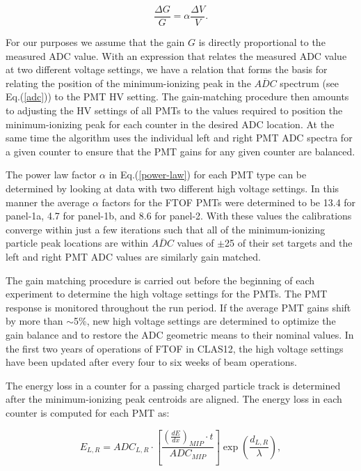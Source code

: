 \documentclass[final,3p,twocolumn]{elsarticle}
\begin{document}
\begin{equation}
\label{delta}
\frac{\Delta G}{G} = \alpha \frac{\Delta V}{V}.
\end{equation}

\noindent
For our purposes we assume that the gain $G$ is directly proportional to the measured ADC value. With an
expression that relates the measured ADC value at two different voltage settings, we have a relation that
forms the basis for relating the position of the minimum-ionizing peak in the $\overline{ADC}$ spectrum
(see Eq.(\ref{adc})) to the PMT HV setting. The gain-matching procedure then amounts to adjusting the HV
settings of all PMTs to the values required to position the minimum-ionizing peak for each counter in the
desired ADC location. At the same time the algorithm uses the individual left and right PMT ADC spectra for
a given counter to ensure that the PMT gains for any given counter are balanced.

The power law factor $\alpha$ in Eq.(\ref{power-law}) for each PMT type can be determined by looking
at data with two different high voltage settings. In this manner the average $\alpha$ factors for the
FTOF PMTs were determined to be 13.4 for panel-1a, 4.7 for panel-1b, and 8.6 for panel-2. With these
values the calibrations converge within just a few iterations such that all of the minimum-ionizing particle
peak locations are within $\overline{ADC}$ values of $\pm$25 of their set targets and the left and right
PMT ADC values are similarly gain matched.

The gain matching procedure is carried out before the beginning of each experiment to determine the
high voltage settings for the PMTs. The PMT response is monitored throughout the run period. If the
average PMT gains shift by more than $\sim$5\%, new high voltage settings are determined to optimize
the gain balance and to restore the ADC geometric means to their nominal values. In the first two years of
operations of FTOF in CLAS12, the high voltage settings have been updated after every four to six weeks
of beam operations.

The energy loss in a counter for a passing charged particle track is determined after the minimum-ionizing
peak centroids are aligned. The energy loss in each counter is computed for each PMT as:

\begin{equation}
E_{L,R} = ADC_{L,R} \cdot \left [ \frac{\left( \frac{dE}{dx} \right)_{MIP} \cdot t}{ADC_{MIP}}\right ]
\exp\left(\frac{d_{L,R}}{\lambda}\right),
\end{equation}
\end{document}
